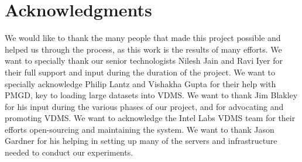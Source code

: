 
\section{Acknowledgments}

We would like to thank the many people that made this project possible and
helped us through the process, as this work is the results of many efforts.
We want to specially thank our senior technologists Nilesh Jain and 
Ravi Iyer for their full support and input during the duration of the project.
We want to specially acknowledge Philip Lantz and Vishakha Gupta for their help
with PMGD, key to loading large datasets into VDMS.
We want to thank Jim Blakley for his input during the various 
phases of our project, and for advocating and promoting VDMS.
We want to acknowledge the Intel Labs VDMS team for their efforts
open-sourcing and maintaining the system.
We want to thank Jason Gardner for his helping in setting up many of 
the servers and infrastructure needed to conduct our experiments.

